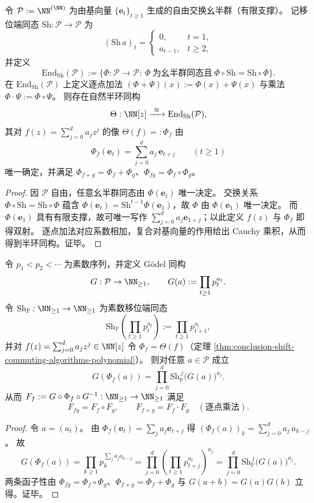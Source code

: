 
\begin{theorem}[移位可交换算法的多项式半环刻画]\label{thm:conclusion-shift-commuting-algorithms-polynomial}
令 \(\mathcal P:=\NN^{(\NN)}\) 为由基向量 \(\{\mathbf e_t\}_{t\ge 1}\) 生成的自由交换幺半群（有限支撑）。
记移位端同态 \(\mathrm{Sh}:\mathcal P\to\mathcal P\) 为
\[
(\mathrm{Sh}\,a)_t=
\begin{cases}
0,&t=1,\\
a_{t-1},&t\ge 2,
\end{cases}
\]
并定义
\[
\mathrm{End}_{\mathrm{Sh}}(\mathcal P):=\{\Phi:\mathcal P\to\mathcal P:\ \Phi\ \text{为幺半群同态且}\ \Phi\circ\mathrm{Sh}=\mathrm{Sh}\circ\Phi\}.
\]
在 \(\mathrm{End}_{\mathrm{Sh}}(\mathcal P)\) 上定义逐点加法 \((\Phi+\Psi)(x):=\Phi(x)+\Psi(x)\) 与乘法 \(\Phi\cdot\Psi:=\Phi\circ\Psi\)。
则存在自然半环同构
\[
\Theta:\NN[z]\xrightarrow{\ \cong\ }\mathrm{End}_{\mathrm{Sh}}(\mathcal P),
\]
其对 \(f(z)=\sum_{j=0}^{d}a_j z^j\) 的像 \(\Theta(f)=:\Phi_f\) 由
\[
\Phi_f(\mathbf e_t)=\sum_{j=0}^{d}a_j\,\mathbf e_{t+j}\qquad(t\ge 1)
\]
唯一确定，并满足 \(\Phi_{f+g}=\Phi_f+\Phi_g\)、\(\Phi_{fg}=\Phi_f\circ\Phi_g\)。
\end{theorem}
\begin{proof}
因 \(\mathcal P\) 自由，任意幺半群同态由 \(\Phi(\mathbf e_t)\) 唯一决定。
交换关系 \(\Phi\circ\mathrm{Sh}=\mathrm{Sh}\circ\Phi\) 蕴含 \(\Phi(\mathbf e_t)=\mathrm{Sh}^{t-1}\Phi(\mathbf e_1)\)，故 \(\Phi\) 由 \(\Phi(\mathbf e_1)\) 唯一决定。
而 \(\Phi(\mathbf e_1)\) 具有有限支撑，故可唯一写作 \(\sum_{j=0}^d a_j \mathbf e_{1+j}\)；以此定义 \(f(z)\) 与 \(\Phi_f\) 即得双射。
逐点加法对应系数相加，复合对基向量的作用给出 Cauchy 乘积，从而得到半环同构。证毕。
\end{proof}

\begin{proposition}\label{prop:conclusion-godel-integerization-prime-shift-polynomial}
令 \(p_1<p_2<\cdots\) 为素数序列，并定义 Gödel 同构
\[
G:\mathcal P\to\NN_{\ge 1},\qquad
G(a):=\prod_{t\ge 1}p_t^{a_t}.
\]
令 \(\mathrm{Sh}_{\mathbb P}:\NN_{\ge 1}\to\NN_{\ge 1}\) 为素数移位端同态
\[
\mathrm{Sh}_{\mathbb P}\!\left(\prod_{t\ge 1}p_t^{a_t}\right):=\prod_{t\ge 1}p_{t+1}^{a_t},
\]
并对 \(f(z)=\sum_{j=0}^d a_j z^j\in\NN[z]\) 令 \(\Phi_f=\Theta(f)\)（定理 \ref{thm:conclusion-shift-commuting-algorithms-polynomial}）。
则对任意 \(a\in\mathcal P\) 成立
\[
G(\Phi_f(a))=\prod_{j=0}^{d}\mathrm{Sh}_{\mathbb P}^{\,j}\!\bigl(G(a)\bigr)^{a_j}.
\]
从而 \(F_f:=G\circ\Phi_f\circ G^{-1}:\NN_{\ge 1}\to\NN_{\ge 1}\) 满足
\[
F_{fg}=F_f\circ F_g,\qquad
F_{f+g}=F_f\cdot F_g\quad(\text{逐点乘法}).
\]
\end{proposition}
\begin{proof}
令 \(a=(a_t)\)。
由 \(\Phi_f(\mathbf e_t)=\sum_j a_j\mathbf e_{t+j}\) 得
\(
(\Phi_f(a))_k=\sum_{j=0}^{d}a_j\,a_{k-j}
\)。
故
\[
G(\Phi_f(a))
=\prod_{k\ge 1}p_k^{\sum_j a_j a_{k-j}}
=\prod_{j=0}^{d}\left(\prod_{t\ge 1}p_{t+j}^{a_t}\right)^{a_j}
=\prod_{j=0}^{d}\mathrm{Sh}_{\mathbb P}^{\,j}\!\bigl(G(a)\bigr)^{a_j}.
\]
两条函子性由 \(\Phi_{fg}=\Phi_f\circ\Phi_g\)、\(\Phi_{f+g}=\Phi_f+\Phi_g\) 与 \(G(a+b)=G(a)G(b)\) 立得。证毕。
\end{proof}

